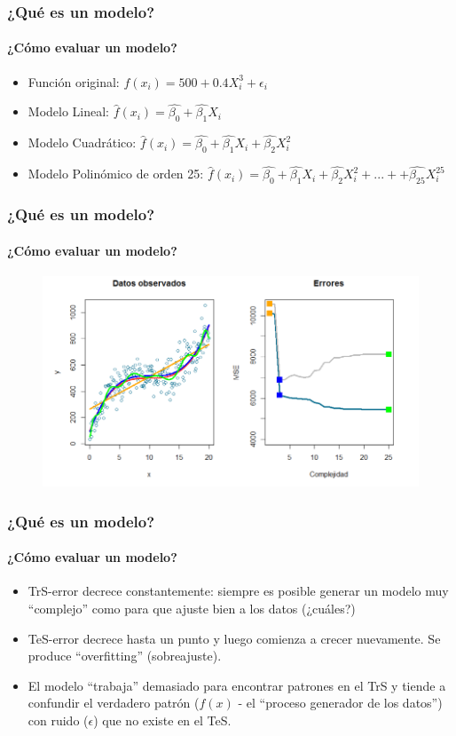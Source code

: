 \documentclass{beamer}
\begin{document}
\begin{frame}
	\frametitle{¿Qué es un modelo?}
	\framesubtitle{¿Cómo evaluar un modelo?}
	\begin{itemize}
		\color{red}
		\item{Función original: $f(x_{i})=500+0.4X_{i}^3+\epsilon_{i}$}
		\color{orange}
		\item{Modelo Lineal: $\hat{f}(x_{i})=\hat{\beta_{0}}+\hat{\beta_{1}}X_{i}$}
		\color{blue}
		\item{Modelo Cuadrático: $\hat{f}(x_{i})=\hat{\beta_{0}}+\hat{\beta_{1}}X_{i}+\hat{\beta_{2}}X_{i}^2$}
		\color{green}
		\item{Modelo Polinómico de orden 25: $\hat{f}(x_{i})=\hat{\beta_{0}}+\hat{\beta_{1}}X_{i}+\hat{\beta_{2}}X_{i}^2+...++\hat{\beta_{25}}X_{i}^{25}$}
	\end{itemize}
\end{frame}

\begin{frame}
	\frametitle{¿Qué es un modelo?}
	\framesubtitle{¿Cómo evaluar un modelo?}
	\begin{figure}
		\centering
		\includegraphics[width=0.9\linewidth, height=0.7\textheight]{img/train_test_error}
	\end{figure}
\end{frame}

\begin{frame}
	\frametitle{¿Qué es un modelo?}	
	\framesubtitle{¿Cómo evaluar un modelo?}
	\begin{itemize}
		\item{TrS-error decrece constantemente: siempre es posible generar un modelo muy “complejo” como para que ajuste bien a los datos (¿cuáles?)}
		\item{TeS-error decrece hasta un punto y 	luego comienza a crecer nuevamente. Se produce “overfitting” (sobreajuste).}
		\item{El modelo “trabaja” demasiado para 		encontrar patrones en el TrS y tiende a confundir el verdadero patrón ($f(x)$ - el “proceso generador de los datos”) con ruido ($\epsilon$) que no existe en el TeS.}
	\end{itemize}
\end{frame}
\end{document}
